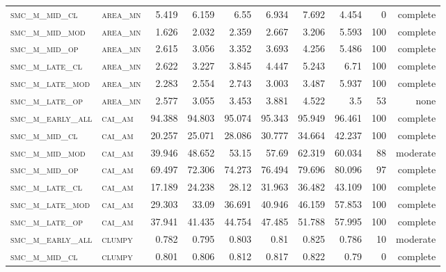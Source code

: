\begin{landscape}
\begin{center}
\begin{footnotesize}
\begin{longtable}{llrrrrr|rrr}
\textsc{smc\_m\_mid\_cl   } & \textsc{area\_mn  }   & 5.419    & 6.159    & 6.55     & 6.934    & 7.692    & 4.454    & 0   & complete \\
\textsc{smc\_m\_mid\_mod  } & \textsc{area\_mn  }   & 1.626    & 2.032    & 2.359    & 2.667    & 3.206    & 5.593    & 100 & complete \\
\textsc{smc\_m\_mid\_op   } & \textsc{area\_mn  }   & 2.615    & 3.056    & 3.352    & 3.693    & 4.256    & 5.486    & 100 & complete \\
\textsc{smc\_m\_late\_cl  } & \textsc{area\_mn  }   & 2.622    & 3.227    & 3.845    & 4.447    & 5.243    & 6.71     & 100 & complete \\
\textsc{smc\_m\_late\_mod } & \textsc{area\_mn  }   & 2.283    & 2.554    & 2.743    & 3.003    & 3.487    & 5.937    & 100 & complete \\
\textsc{smc\_m\_late\_op  } & \textsc{area\_mn  }   & 2.577    & 3.055    & 3.453    & 3.881    & 4.522    & 3.5      & 53  & none     \\
\textsc{smc\_m\_early\_all} & \textsc{cai\_am   }   & 94.388   & 94.803   & 95.074   & 95.343   & 95.949   & 96.461   & 100 & complete \\
\textsc{smc\_m\_mid\_cl   } & \textsc{cai\_am   }   & 20.257   & 25.071   & 28.086   & 30.777   & 34.664   & 42.237   & 100 & complete \\
\textsc{smc\_m\_mid\_mod  } & \textsc{cai\_am   }   & 39.946   & 48.652   & 53.15    & 57.69    & 62.319   & 60.034   & 88  & moderate \\
\textsc{smc\_m\_mid\_op   } & \textsc{cai\_am   }   & 69.497   & 72.306   & 74.273   & 76.494   & 79.696   & 80.096   & 97  & complete \\
\textsc{smc\_m\_late\_cl  } & \textsc{cai\_am   }   & 17.189   & 24.238   & 28.12    & 31.963   & 36.482   & 43.109   & 100 & complete \\
\textsc{smc\_m\_late\_mod } & \textsc{cai\_am   }   & 29.303   & 33.09    & 36.691   & 40.946   & 46.159   & 57.853   & 100 & complete \\
\textsc{smc\_m\_late\_op  } & \textsc{cai\_am   }   & 37.941   & 41.435   & 44.754   & 47.485   & 51.788   & 57.995   & 100 & complete \\
\textsc{smc\_m\_early\_all} & \textsc{clumpy    }   & 0.782    & 0.795    & 0.803    & 0.81     & 0.825    & 0.786    & 10  & moderate \\
\textsc{smc\_m\_mid\_cl   } & \textsc{clumpy    }   & 0.801    & 0.806    & 0.812    & 0.817    & 0.822    & 0.79     & 0   & complete \\

\end{longtable}
\end{footnotesize}
\end{center}
\end{landscape}
